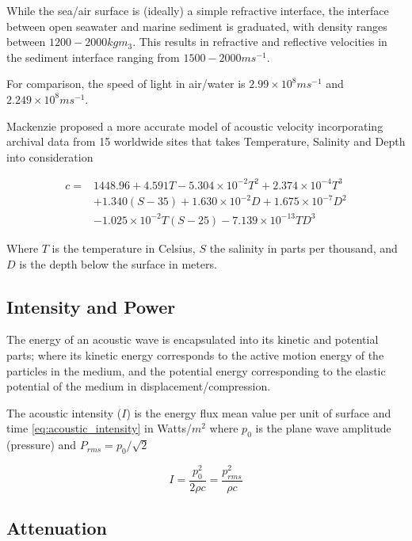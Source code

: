 While the sea/air surface is (ideally) a simple refractive interface, the interface between open seawater and marine sediment is graduated, with density ranges between $1200 - 2000 kg m_{3}$. 
This results in refractive and reflective velocities in the sediment interface ranging from $1500-2000 ms^{-1}$.\cite{lurton2010} 

For comparison, the speed of light in air/water is $2.99 \times 10^8 ms^{-1}$ and $2.249 \times 10^{8} ms^{-1}$.

Mackenzie proposed a more accurate model of acoustic velocity incorporating archival data from 15 worldwide sites that takes Temperature, Salinity and Depth into consideration \cite{Mackenzie1981}

\begin{align}
  c = & 1448.96 + 4.591 T - 5.304 \times 10^{-2} T^2 + 2.374 \times 10^{-4}T^{3}\\
  & +1.340 (S-35) + 1.630\times 10^{-2}D+1.675\times 10^{-7}D^2\\
  & -1.025 \times 10^{-2}T(S-25) - 7.139\times 10^{-13}TD^3
  \label{equ:mackenzie}
\end{align}

Where $T$ is the temperature in Celsius, $S$ the salinity in parts per thousand, and $D$ is the depth below the surface in meters.

\subsection{Intensity and Power} 

The energy of an acoustic wave is encapsulated into its kinetic and potential parts; where its kinetic energy corresponds to the active motion energy of the particles in the medium, and the potential energy corresponding to the elastic potential of the medium in displacement/compression.

The acoustic intensity ($I$) is the energy flux mean value per unit of surface and time \eqref{eq:acoustic_intensity} in Watts/$m^2$ where $p_0$ is the plane wave amplitude (pressure) and $P_{rms} = p_0/\sqrt{2}$

\begin{equation}
  I = \frac{p_0^2}{2\rho c} = \frac{p_{rms}^2}{\rho c}
  \label{eq:acoustic_intensity}
\end{equation}

\subsection{Attenuation}

